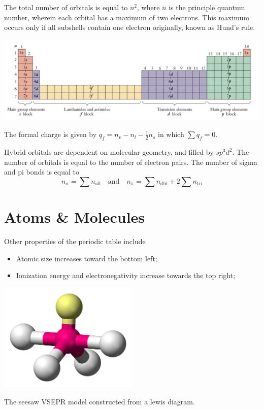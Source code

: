 \documentclass{tufte-book}
\begin{document}
The total number of orbitals is equal to $n^2$, where $n$ is the principle quantum number, wherein each orbital has a maximum of two electrons.
%
%
This maximum occurs only if all subshells contain one electron originally, known as Hund's rule.

\begin{center}
  \includegraphics[width=1\textwidth]{table}
\end{center}

The formal charge is given by $q_f = n_v - n_l - \frac{1}{2} n_s$ in which $\sum q_f = 0$.


Hybrid orbitals are dependent on molecular geometry, and filled by $sp^3d^2$. The number of orbitals is equal to the number of electron pairs. The number of sigma and pi bonds is equal to \begin{equation}
  n_\sigma = \sum n_\text{all} \quad\text{and}\quad n_\pi = \sum n_\text{dbl} + 2 \sum n_\text{tri}
\end{equation}

\section{Atoms \& Molecules}
Other properties of the periodic table include \begin{itemize}
  \item Atomic size increases toward the bottom left;
  \item Ionization energy and electronegativity increase towards the top right;
\end{itemize}

\begin{marginfigure}
\begin{center}
  \includegraphics[width=0.5\textwidth]{molecule1} \phantom{mmm}
\end{center}
\caption{The seesaw VSEPR model constructed from a lewis diagram.}
\end{marginfigure}
\end{document}
